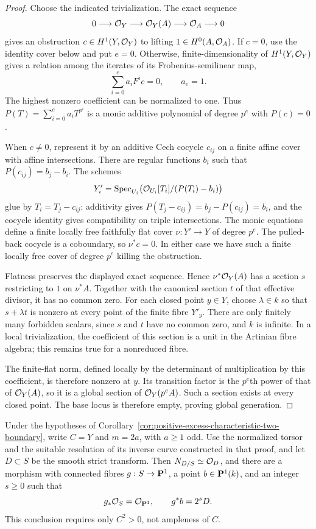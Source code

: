 \begin{proof}
Choose the indicated trivialization.  The exact sequence
\[
 0\longrightarrow\mathcal O_Y\longrightarrow\mathcal O_Y(A)
   \longrightarrow\mathcal O_A\longrightarrow0
\]
gives an obstruction $c\in H^1(Y,\mathcal O_Y)$ to lifting
$1\in H^0(A,\mathcal O_A)$.  If $c=0$, use the identity cover below and
put $e=0$.  Otherwise, finite-dimensionality of $H^1(Y,\mathcal O_Y)$
gives a relation among the iterates of its Frobenius-semilinear map,
\[
 \sum_{i=0}^e a_iF^ic=0,\qquad a_e=1.
\]
The highest nonzero coefficient can be normalized to one.
Thus $P(T)=\sum_{i=0}^e a_iT^{p^i}$ is a monic additive polynomial
of degree $p^e$ with $P(c)=0$.

When $c\ne0$, represent it by an additive Cech cocycle $c_{ij}$ on a
finite affine cover with affine intersections.  There are regular
functions $b_i$ such that $P(c_{ij})=b_j-b_i$.  The schemes
\[
 Y'_i=\operatorname{Spec}_{U_i}
       \bigl(\mathcal O_{U_i}[T_i]/(P(T_i)-b_i)\bigr)
\]
glue by $T_i=T_j-c_{ij}$: additivity gives
$P(T_j-c_{ij})=b_j-P(c_{ij})=b_i$, and the cocycle identity gives
compatibility on triple intersections.  The monic equations define
a finite locally free faithfully flat cover
$\nu:Y'\to Y$ of degree $p^e$.  The pulled-back cocycle is a
coboundary, so $\nu^*c=0$.  In either case we have such a finite
locally free cover of degree $p^e$ killing the obstruction.

Flatness preserves the displayed exact sequence.  Hence
$\nu^*\mathcal O_Y(A)$ has a section $s$ restricting to $1$ on $\nu^*A$.
Together with the canonical section $t$ of that effective divisor,
it has no common zero.  For each closed point $y\in Y$, choose
$\lambda\in k$ so that $s+\lambda t$ is nonzero at every point of
the finite fibre $Y'_y$.  There are only finitely many forbidden
scalars, since $s$ and $t$ have no common zero, and $k$ is infinite.
In a local trivialization, the coefficient of this section is a unit
in the Artinian fibre algebra; this remains true for a nonreduced
fibre.

The finite-flat norm, defined locally by the determinant of
multiplication by this coefficient, is therefore nonzero at $y$.
Its transition factor is the $p^e$th power of that of $\mathcal O_Y(A)$,
so it is a global section of $\mathcal O_Y(p^eA)$.
Such a section exists at every closed point.  The base locus is
therefore empty, proving global generation.
\end{proof}

\begin{proposition}
\label{prop:boundary-resolved-fibration}
Under the hypotheses of
Corollary~\ref{cor:positive-excess-characteristic-two-boundary},
write $C=Y$ and $m=2a$, with $a\geq1$ odd.
Use the normalized torsor and the suitable resolution of its inverse
curve constructed in that proof, and let $D\subset S$ be the smooth
strict transform.  Then $N_{D/S}\simeq\mathcal O_D$, and there are a
morphism with connected fibres
$g:S\to\mathbf P^1$, a point $b\in\mathbf P^1(k)$, and an integer $s\geq0$
such that
\begin{equation}\label{eq:boundary-fibration-fibre}
 g_*\mathcal O_S=\mathcal O_{\mathbf P^1},\qquad g^*b=2^sD.
\end{equation}
This conclusion requires only $C^2>0$, not ampleness of $C$.
\end{proposition}

